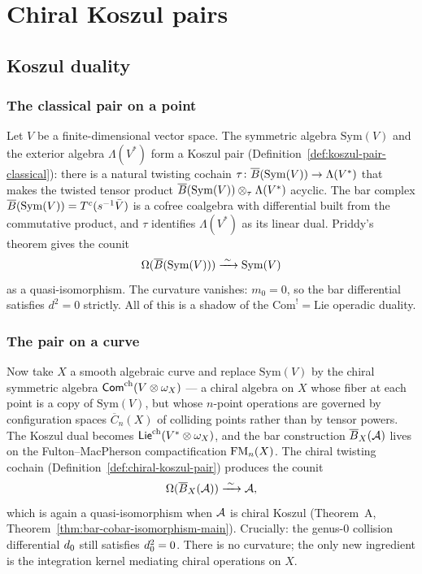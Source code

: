 
\chapter{Chiral Koszul pairs}


\section{Koszul duality}

\subsection{The classical pair on a point}

Let $V$ be a finite-dimensional vector space.  The symmetric algebra $\mathrm{Sym}(V)$ and the exterior algebra $\Lambda(V^*)$ form a Koszul pair
(Definition~\ref{def:koszul-pair-classical}): there is a natural twisting cochain
$\tau\colon \overline{B}(\mathrm{Sym}(V)) \to \Lambda(V^*)$ that makes the
twisted tensor product $\overline{B}(\mathrm{Sym}(V)) \otimes_\tau \Lambda(V^*)$ acyclic.  The bar complex $\overline{B}(\mathrm{Sym}(V)) = T^c(s^{-1}\bar{V})$ is a cofree
coalgebra with differential built from the commutative product, and
$\tau$ identifies $\Lambda(V^*)$ as its linear dual.  Priddy's theorem \cite{Priddy70} gives the counit
\[
  \Omega(\overline{B}(\mathrm{Sym}(V))) \xrightarrow{\;\sim\;} \mathrm{Sym}(V)
\]
as a quasi-isomorphism.  The curvature vanishes: $m_0 = 0$, so the bar
differential satisfies $d^2 = 0$ strictly.  All of this is a
shadow of the $\mathrm{Com}^! = \mathrm{Lie}$ operadic duality.

\subsection{The pair on a curve}

Now take $X$ a smooth algebraic curve and replace
$\mathrm{Sym}(V)$ by the chiral symmetric algebra
$\mathsf{Com}^{\mathrm{ch}}(V \otimes \omega_X)$ --- a chiral algebra on $X$ whose fiber
at each point is a copy of $\mathrm{Sym}(V)$, but whose
$n$-point operations are governed by configuration spaces
$\overline{C}_n(X)$ of colliding points rather than by tensor powers.
The Koszul dual becomes $\mathsf{Lie}^{\mathrm{ch}}(V^* \otimes \omega_X)$, and the bar
construction $\overline{B}_X(\mathcal{A})$ lives on the Fulton--MacPherson
compactification $\mathrm{FM}_n(X)$.  The chiral twisting cochain
(Definition~\ref{def:chiral-koszul-pair}) produces the counit
\[
  \Omega(\overline{B}_X(\mathcal{A})) \xrightarrow{\;\sim\;} \mathcal{A},
\]
which is again a quasi-isomorphism when $\mathcal{A}$ is chiral Koszul
(Theorem~A, Theorem~\ref{thm:bar-cobar-isomorphism-main}).  Crucially:
the genus-$0$ collision differential $d_0$ still satisfies
$d_0^2 = 0$.  There is no curvature; the only new ingredient is
the integration kernel mediating chiral operations on $X$.


